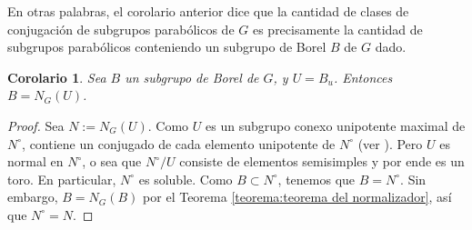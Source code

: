\documentclass[spanish,10pt]{amsart}
\newtheorem{corollary}[theorem]{Corolario}
\theoremstyle{definition}
\theoremstyle{remark}
\numberwithin{equation}{section}
\begin{document}
En otras palabras, el corolario anterior dice que la cantidad de clases de conjugación de subgrupos parabólicos de $G$ es precisamente la cantidad de subgrupos parabólicos conteniendo un subgrupo de Borel $B$ de $G$ dado.

\begin{corollary}
Sea $B$ un subgrupo de Borel de $G$, y $U = B_u$. Entonces $B = N_G (U)$.
\end{corollary}
\begin{proof}
Sea $N := N_G (U)$. Como $U$ es un subgrupo conexo unipotente maximal de $N^\circ$, contiene un conjugado de cada elemento unipotente de $N^\circ$ (ver \cite[Teorema 22.2]{humphreys2012linearAlgebraicGroups}). Pero $U$ es normal en $N^\circ$, o sea que $N^\circ / U$ consiste de elementos semisimples y por ende es un toro. En particular, $N^\circ$ es soluble. Como $B \subset N^\circ$, tenemos que $B = N^\circ$. Sin embargo, $B = N_G (B)$ por el Teorema \ref{teorema:teorema del normalizador}, así que $N^\circ = N$.
\end{proof}









\end{document}
